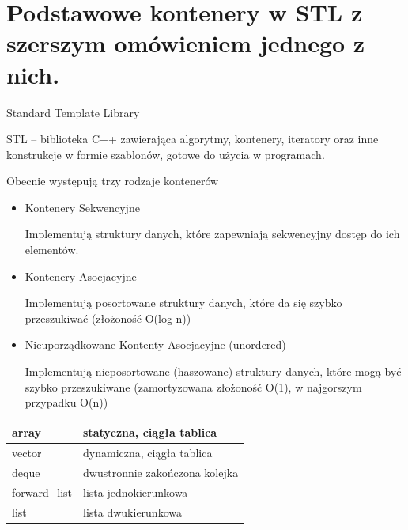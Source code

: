 \documentclass[12pt]{article}
\begin{document}
    \section{Podstawowe kontenery w STL z szerszym omówieniem jednego z nich.}
    \begin{definition}
        Standard Template Library

        STL – biblioteka C++ zawierająca algorytmy, kontenery, iteratory oraz inne konstrukcje w formie szablonów, gotowe do użycia w programach.
    \end{definition}

    Obecnie występują trzy rodzaje kontenerów
    \begin{itemize}
        \item Kontenery Sekwencyjne

        Implementują struktury danych, które zapewniają sekwencyjny dostęp do ich elementów.

        \item Kontenery Asocjacyjne

        Implementują posortowane struktury danych, które da się szybko przeszukiwać (złożoność O(log n))


        \item Nieuporządkowane Kontenty Asocjacyjne (unordered)

        Implementują nieposortowane (haszowane) struktury danych, które mogą być szybko przeszukiwane (zamortyzowana złożoność O(1), w najgorszym przypadku O(n))

    \end{itemize}

    \begin{table}[]
        \begin{tabular}{|l|l|}
            \hline
            array & statyczna, ciągła tablica      \\ \hline
            vector & dynamiczna, ciągła tablica     \\ \hline
            deque & dwustronnie zakończona kolejka \\ \hline
            forward\_list & lista jednokierunkowa          \\ \hline
            list & lista dwukierunkowa            \\ \hline
        \end{tabular}
    \end{table}
\end{document}
